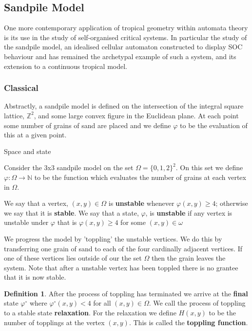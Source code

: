 \documentclass[12pt,a4paper]{amsart}
\newcommand{\N}{\mathbb{N}}
\newcommand{\Z}{\mathbb{Z}}
\theoremstyle{definition}
\newtheorem{defn}{Definition}[section]
\theoremstyle{remark}
\begin{document}
\subsection{Sandpile Model}
One more contemporary application of tropical geometry within automata theory is its use in the study of self-organised critical systems\cite{bak1987self, bak1988self}. In particular the study of the sandpile model, an idealised cellular automaton constructed to display SOC behaviour and has remained the archetypal example of such a system, and its extension to a continuous tropical model\cite{kalinin2018self}.

\subsubsection{Classical}
Abstractly, a sandpile model is defined on the intersection of the integral square lattice, $\Z^2$, and some large convex figure in the Euclidean plane. At each point some number of grains of sand are placed and we define $\varphi$ to be the evaluation of this at a given point.

Space and state

\ex
Consider the 3x3 sandpile model on the set $\Omega=\{0,1,2\}^2$. On this set we define $\varphi:\Omega\to\N$ to be the function which evaluates the number of grains at each vertex in $\Omega$.

We say that a vertex, $(x,y)\in\Omega$ is \textbf{unstable} whenever $\varphi(x,y) \geq 4$; otherwise we say that it is \textbf{stable}. We say that a state, $\varphi$, is \textbf{unstable} if any vertex is unstable under $\varphi$ that is $\varphi(x,y) \geq 4$ for some $(x,y)\in \omega$

We progress the model by 'toppling' the unstable vertices. We do this by transferring one grain of sand to each of the four cardinally adjacent vertices. If one of these vertices lies outside of our the set $\Omega$ then the grain leaves the system. Note that after a unstable vertex has been toppled there is no grantee that it is now stable.

\begin{defn}
After the process of toppling has terminated we arrive at the \textbf{final} state $\varphi^\circ$ where $\varphi^\circ(x,y)<4$ for all $(x,y)\in\Omega$. We call the process of toppling to a stable state \textbf{relaxation}. For the relaxation we define $H(x,y)$ to be the number of topplings at the vertex $(x,y)$. This is called the \textbf{toppling function}.
\end{defn}
\end{document}
